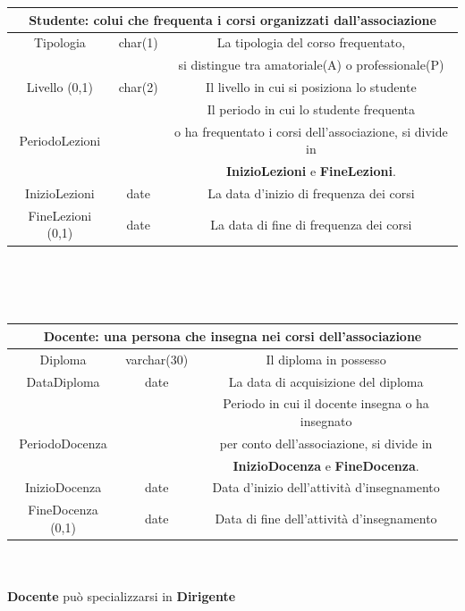 \documentclass[11pt]{article}
\begin{document}
		\begin{tabular}{|c|c|c|}
			\hline
			\multicolumn{3}{|c|}{\textbf{Studente}: colui che frequenta i corsi organizzati dall'associazione}\\
			\hline
			Tipologia & char(1) & La tipologia del corso frequentato,\\
			 &  & si distingue tra amatoriale(A) o professionale(P) \\
			\hline
			Livello (0,1) & char(2) & Il livello in cui si posiziona lo studente\\
			\hline
			&  & Il periodo in cui lo studente frequenta\\
			PeriodoLezioni &  & o ha frequentato i corsi dell'associazione, si divide in\\
			&  &\textbf{InizioLezioni} e \textbf{FineLezioni}.\\
			InizioLezioni & date & La data d'inizio di frequenza dei corsi\\
			FineLezioni (0,1) & date & La data di fine di frequenza dei corsi\\
			\hline
		\end{tabular}
		\\\\\\
		\begin{tabular}{|c|c|c|}
			\hline
			\multicolumn{3}{|c|}{\textbf{Docente}: una persona che insegna nei corsi dell'associazione}\\
			\hline
			Diploma & varchar(30) & Il diploma in possesso\\
			\hline
			DataDiploma & date & La data di acquisizione del diploma\\
			\hline
			&  & Periodo in cui il docente insegna o ha insegnato\\
			PeriodoDocenza &  & per conto dell'associazione, si divide in\\
			&  &\textbf{InizioDocenza} e \textbf{FineDocenza}.\\
			InizioDocenza & date & Data d'inizio dell'attività d'insegnamento\\
			FineDocenza (0,1) & date & Data di fine dell'attività d'insegnamento\\
			\hline
		\end{tabular}
		\\\\
		\textbf{Docente} può specializzarsi in \textbf{Dirigente}
		\\\\
\end{document}
